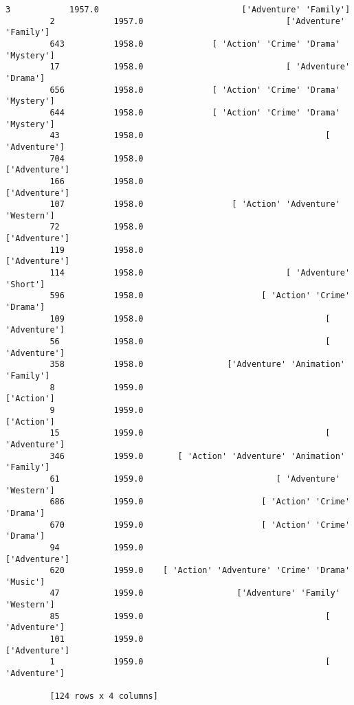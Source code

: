 \documentclass[11pt]{article}
\begin{document}
\begin{Verbatim}[commandchars=\\\{\}]
         3            1957.0                             ['Adventure' 'Family']  
         2            1957.0                             ['Adventure' 'Family']  
         643          1958.0              [ 'Action' 'Crime' 'Drama' 'Mystery']  
         17           1958.0                             [ 'Adventure' 'Drama']  
         656          1958.0              [ 'Action' 'Crime' 'Drama' 'Mystery']  
         644          1958.0              [ 'Action' 'Crime' 'Drama' 'Mystery']  
         43           1958.0                                     [ 'Adventure']  
         704          1958.0                                      ['Adventure']  
         166          1958.0                                      ['Adventure']  
         107          1958.0                  [ 'Action' 'Adventure' 'Western']  
         72           1958.0                                      ['Adventure']  
         119          1958.0                                      ['Adventure']  
         114          1958.0                             [ 'Adventure' 'Short']  
         596          1958.0                        [ 'Action' 'Crime' 'Drama']  
         109          1958.0                                     [ 'Adventure']  
         56           1958.0                                     [ 'Adventure']  
         358          1958.0                 ['Adventure' 'Animation' 'Family']  
         8            1959.0                                         ['Action']  
         9            1959.0                                         ['Action']  
         15           1959.0                                     [ 'Adventure']  
         346          1959.0       [ 'Action' 'Adventure' 'Animation' 'Family']  
         61           1959.0                           [ 'Adventure' 'Western']  
         686          1959.0                        [ 'Action' 'Crime' 'Drama']  
         670          1959.0                        [ 'Action' 'Crime' 'Drama']  
         94           1959.0                                      ['Adventure']  
         620          1959.0    [ 'Action' 'Adventure' 'Crime' 'Drama' 'Music']  
         47           1959.0                   ['Adventure' 'Family' 'Western']  
         85           1959.0                                     [ 'Adventure']  
         101          1959.0                                      ['Adventure']  
         1            1959.0                                     [ 'Adventure']  
         
         [124 rows x 4 columns]
\end{Verbatim}
            
\end{document}
